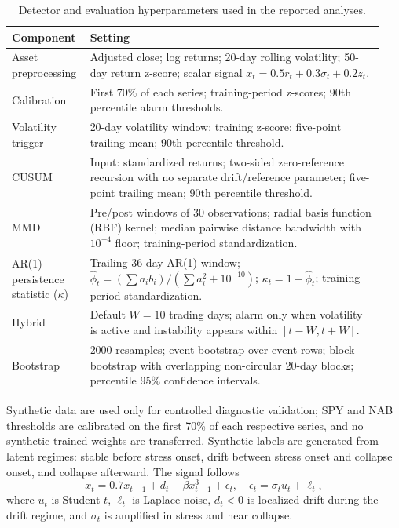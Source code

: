 \documentclass[pdflatex,sn-mathphys-num]{sn-jnl}
\begin{document}
\begin{appendices}
\begin{table}[t]
\centering
\caption{Detector and evaluation hyperparameters used in the reported analyses.}
\label{tab:hyperparams}
\scriptsize
\begin{tabular}{p{0.18\linewidth}p{0.76\linewidth}}
\toprule
Component & Setting \\
\midrule
Asset preprocessing & Adjusted close; log returns; 20-day rolling volatility; 50-day return z-score; scalar signal $x_t=0.5r_t+0.3\sigma_t+0.2z_t$.\\
Calibration & First 70\% of each series; training-period z-scores; 90th percentile alarm thresholds.\\
Volatility trigger & 20-day volatility window; training z-score; five-point trailing mean; 90th percentile threshold.\\
CUSUM & Input: standardized returns; two-sided zero-reference recursion with no separate drift/reference parameter; five-point trailing mean; 90th percentile threshold.\\
MMD & Pre/post windows of 30 observations; radial basis function (RBF) kernel; median pairwise distance bandwidth with $10^{-4}$ floor; training-period standardization.\\
AR(1) persistence statistic ($\kappa$) & Trailing 36-day AR(1) window; $\widehat\phi_t=(\sum a_i b_i)/(\sum a_i^2+10^{-10})$; $\kappa_t=1-\widehat\phi_t$; training-period standardization.\\
Hybrid & Default $W=10$ trading days; alarm only when volatility is active and instability appears within $[t-W,t+W]$.\\
Bootstrap & 2000 resamples; event bootstrap over event rows; block bootstrap with overlapping non-circular 20-day blocks; percentile 95\% confidence intervals.\\
\bottomrule
\end{tabular}
\end{table}

Synthetic data are used only for controlled diagnostic validation; SPY and NAB thresholds are calibrated on the first 70\% of each respective series, and no synthetic-trained weights are transferred. Synthetic labels are generated from latent regimes: stable before stress onset, drift between stress onset and collapse onset, and collapse afterward. The signal follows
\begin{equation}
x_t=0.7x_{t-1}+d_t-\beta x_{t-1}^3+\epsilon_t,\quad
\epsilon_t=\sigma_t u_t+\ell_t,
\end{equation}
where $u_t$ is Student-$t$, $\ell_t$ is Laplace noise, $d_t<0$ is localized drift during the drift regime, and $\sigma_t$ is amplified in stress and near collapse.


\end{appendices}
\end{document}
